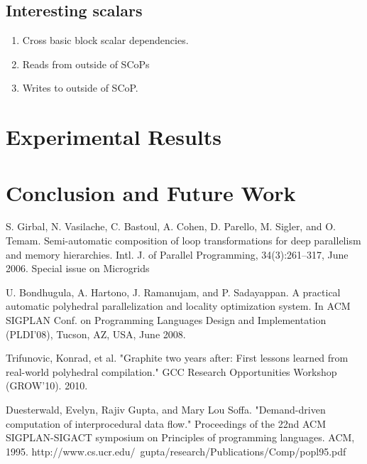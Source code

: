 \subsection{Interesting scalars}
\begin{enumerate}
        \item Cross basic block scalar dependencies.
        \item Reads from outside of SCoPs
        \item Writes to outside of SCoP.
\end{enumerate}



\section{Experimental Results}

\section{Conclusion and Future Work}



S. Girbal, N. Vasilache, C. Bastoul, A. Cohen, D. Parello, M. Sigler, and O. Temam.
Semi-automatic composition of loop transformations for deep parallelism and memory
hierarchies. Intl. J. of Parallel Programming, 34(3):261–317, June 2006. Special issue on
Microgrids


U. Bondhugula, A. Hartono, J. Ramanujam, and P. Sadayappan. A practical automatic
polyhedral parallelization and locality optimization system. In ACM SIGPLAN Conf. on
Programming Languages Design and Implementation (PLDI’08), Tucson, AZ, USA, June
2008.

Trifunovic, Konrad, et al. "Graphite two years after: First lessons learned
from real-world polyhedral compilation."
GCC Research Opportunities Workshop (GROW'10). 2010.


Duesterwald, Evelyn, Rajiv Gupta, and Mary Lou Soffa. "Demand-driven computation of interprocedural data flow." Proceedings of the 22nd ACM SIGPLAN-SIGACT symposium on Principles of programming languages. ACM, 1995.
http://www.cs.ucr.edu/~gupta/research/Publications/Comp/popl95.pdf

